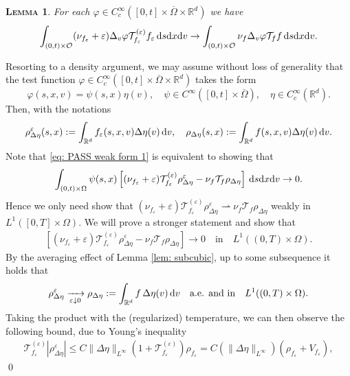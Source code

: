 \documentclass[10pt, reqno]{amsart}
\theoremstyle{plain}
\newtheorem{lemma}[theorem]{\normalfont \scshape Lemma}
\theoremstyle{definition}
\theoremstyle{remark}
\renewenvironment{proof}[1][\proofname]{\noindent{\scshape #1.\quad}}{\qed}
\numberwithin{equation}{section}
\newcommand{\calO}{\mathcal O}
\newcommand{\calT}{\mathcal T}
\newcommand{\R}{\mathbb{R}}
\newcommand{\ve}{\varepsilon}
\newcommand{\dx}{\textnormal{d}x}
\newcommand{\dv}{\textnormal{d}v}
\newcommand{\ds}{\textnormal{d}s}
\newcommand{\weakto}{\rightharpoonup}
\newcommand{\lt}{\left}
\newcommand{\rt}{\right}
\newcommand{\intr}{\int_{\R^d}}
\begin{document}
\begin{lemma}
For each $\varphi\in C_c^\infty([0,t]\times \overline{\Omega}\times \R^d)$ we have
\begin{align}\label{eq: PASS weak form 1}
    \int_{(0,t)\times \calO} (\nu_{f_\ve} + \ve) \Delta_v \varphi \calT_{f_\ve}^{(\ve)} f_\ve \,\ds\dx\dv  \to \int_{(0,t)\times \calO} \nu_{f} \Delta_v \varphi \calT_f f \,\ds\dx\dv.
\end{align}
\end{lemma}
\begin{proof}
Resorting to a density argument, we may assume without loss of generality that the test function $\varphi\in C_c^\infty([0,t]\times\overline\Omega\times\R^d)$ takes the form
\[
    \varphi(s,x,v) = \psi(s,x) \eta(v), \quad \psi\in C^\infty([0,t]\times \overline{\Omega}), \quad \eta\in C_c^\infty(\R^d).
\]
Then, with the notations
\[
 \rho_{\Delta\eta}^\ve(s,x) := \intr f_\ve(s,x,v) \Delta\eta(v) \,\dv, \quad \rho_{\Delta\eta}(s,x) := \intr f(s,x,v) \Delta\eta(v)\,\dv.
\]
Note that \eqref{eq: PASS weak form 1} is equivalent to showing that
\begin{align} \label{eq: PASS weak form 1, EQUIV}
    \int_{(0,t)\times \Omega} \psi(s,x) \lt[ (\nu_{f_\ve} + \ve) \calT_{f_\ve}^{(\ve)} \rho_{\Delta\eta}^\ve - \nu_f \calT_f \rho_{\Delta\eta} \rt] \,\ds\dx\dv \to 0.
\end{align}
Hence we only need show that $(\nu_{f_\ve} + \ve) \calT_{f_\ve}^{(\ve)} \rho_{\Delta\eta}^\ve \weakto \nu_f \calT_f \rho_{\Delta\eta}$ weakly in $L^1([0,T]\times \Omega)$. We will prove a stronger statement and show that
\begin{align}\label{eq: stronger}
     \lt[ (\nu_{f_\ve} + \ve) \calT_{f_\ve}^{(\ve)} \rho_{\Delta\eta}^\ve - \nu_f \calT_f \rho_{\Delta\eta} \rt] \to 0 \quad \text{in} \quad L^1((0,T)\times\Omega).
\end{align}
By the averaging effect of Lemma \ref{lem: subcubic}, up to some subsequence it holds that
\begin{align} \label{eq: RHO ETA}
    \rho_{\Delta\eta}^\ve \xrightarrow[\ve\downarrow 0]{} \rho_{\Delta\eta} := \intr f\,\Delta\eta(v)\,\dv \quad \text{a.e. and in} \quad L^1((0,T)\times\Omega).
\end{align}
Taking the product with the (regularized) temperature, we can then observe the following bound, due to Young's inequality
\begin{align}\label{eq: eta YOUNG}
    \calT_{f_\ve}^{(\ve)} |\rho_{\Delta\eta}^\ve| \le C \|\Delta\eta\|_{L^\infty} \lt(1 + \calT_{f_\ve}^{(\ve)}\rt)  \rho_{f_\ve} = C(\|\Delta\eta\|_{L^\infty}) (\rho_{f_\ve} + V_{f_\ve}),

\end{align}
\end{proof}
\end{document}
